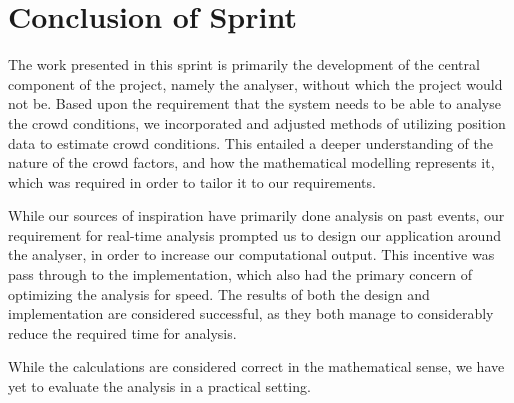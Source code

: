 \section{Conclusion of Sprint}

The work presented in this sprint is primarily the development of the central component of the project, namely the analyser, without which the project would not be. Based upon the requirement that the system needs to be able to analyse the crowd conditions, we incorporated and adjusted methods of utilizing position data to estimate crowd conditions. This entailed a deeper understanding of the nature of the crowd factors, and how the mathematical modelling represents it, which was required in order to tailor it to our requirements.

While our sources of inspiration have primarily done analysis on past events, our requirement for real-time analysis prompted us to design our application around the analyser, in order to increase our computational output. This incentive was pass through to the implementation, which also had the primary concern of optimizing the analysis for speed. The results of both the design and implementation are considered successful, as they both manage to considerably reduce the required time for analysis.

While the calculations are considered correct in the mathematical sense, we have yet to evaluate the analysis in a practical setting.